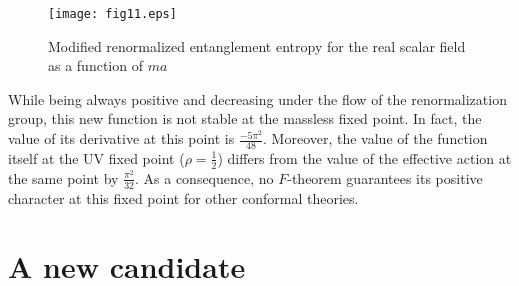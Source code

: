\documentclass[12pt,a4paper]{article}
\numberwithin{equation}{section}
\begin{document}
\begin{figure}[h]
\centering
\texttt{[image: fig11.eps]}
\caption{Modified renormalized entanglement entropy for the real scalar field as a function of $ma$}
\label{figure7}
\end{figure}


While being always positive and decreasing under the flow of the renormalization group, this new function is not stable at the massless fixed point. In fact, the value of its derivative at this point is $\frac{-5{\pi}^2}{48}$. Moreover, the value of the function itself at the UV fixed point ($\rho=\frac12$) differs from the value of the effective action at the same point by $\frac{{\pi}^2}{32}$. As a consequence, no $F$-theorem guarantees its positive character at this fixed point for other conformal theories.

\section {A new candidate}\label{sect5}
\end{document}
